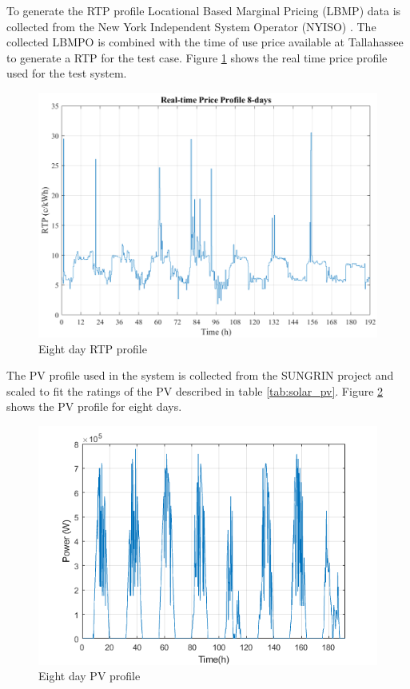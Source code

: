 To generate the RTP profile Locational Based Marginal Pricing (LBMP) data is collected from the New York Independent System Operator (NYISO) \cite{NYISO2017}. The collected LBMPO is combined with the time of use price available at Tallahassee to generate a RTP for the test case. Figure \ref{fig:RTP_PROFILE_8} shows the real time price profile used for the test system.

\begin{figure}[!ht]
    \centering
    \includegraphics[width = \linewidth]{figs/rtp_8days.png}
    \caption{Eight day RTP profile}
    \label{fig:RTP_PROFILE_8}
\end{figure}

The PV profile used in the system is collected from the SUNGRIN project and scaled to fit the ratings of the PV described in table \ref{tab:solar_pv}. Figure \ref{fig:PV_PROFILE_8} shows the PV profile for eight days.

\begin{figure}[!ht]
    \centering
    \includegraphics[width = \linewidth]{figs/PV_PROFILE.png}
    \caption{Eight day PV profile}
    \label{fig:PV_PROFILE_8}
\end{figure}